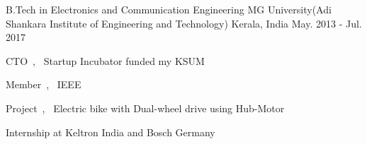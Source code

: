 

\begin{cventries}

  \cventry
    {B.Tech in Electronics and Communication Engineering} %
    {MG University(Adi Shankara Institute of Engineering and Technology)} %
    {Kerala, India} %
    {May. 2013 - Jul. 2017} %
    {
      \begin{cvitems} %
        \item {CTO~,~ Startup Incubator funded my KSUM}
        \item {Member~,~ IEEE}
        \item {Project~,~ Electric bike with Dual-wheel drive using Hub-Motor } 
        \item {Internship at Keltron India and Bosch Germany}  
    \end{cvitems}
    }

\end{cventries}

